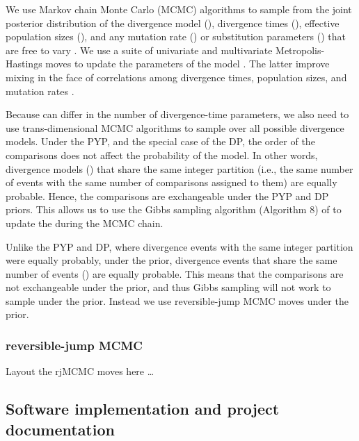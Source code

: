 \documentclass[letterpaper,12pt]{article}
\begin{document}
We use Markov chain Monte Carlo (MCMC) algorithms to sample from the joint
posterior distribution of the divergence model (\etimesets), divergence times
(\etimes), effective population sizes (\epopsize), and any mutation rate
(\murate) or substitution parameters (\gfreq) that are free to vary
\cite{Oaks2018ecoevolity,Oaks2019codemog}.
We use a suite of univariate and multivariate Metropolis-Hastings moves to
update the parameters of the model \citep{Metropolis1953,Hastings1970}.
The latter improve mixing in the face of correlations among divergence times,
population sizes, and mutation rates \citep[see][]{Oaks2018ecoevolity}.

Because \etimesets can differ in the number of divergence-time parameters, we
also need to use trans-dimensional MCMC algorithms to sample over all possible
divergence models.
Under the PYP, and the special case of the DP, the order of the comparisons
does not affect the probability of the model.
In other words, divergence models (\etimesets) that share the same integer
partition (i.e., the same number of events with the same number of comparisons
assigned to them) are equally probable.
Hence, the comparisons are exchangeable under the PYP and DP priors.
This allows us to use the Gibbs sampling algorithm (Algorithm 8) of
\citet{Neal2000} to update the \etimesets during the MCMC chain.

Unlike the PYP and DP, where divergence events with the same
integer partition were equally probably, under the
\wunif prior, divergence events that share the same number of events (\nevents) are
equally probable.
This means that the comparisons are not exchangeable under the \wunif prior,
and thus Gibbs sampling will not work to sample \etimesets under the \wunif
prior.
Instead we use reversible-jump MCMC moves under the \wunif prior.

\subsubsection{reversible-jump MCMC}
Layout the rjMCMC moves here \ldots


\subsection{Software implementation and project documentation}
\end{document}
